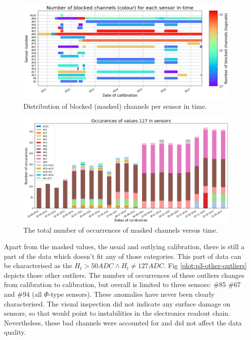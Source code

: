 \begin{figure}
    \centering
    \includegraphics[width=0.95\linewidth]{figures/chapter4/calib_analysis/P3-mask-time.png}
    \caption{Distribution of blocked (masked) channels per sensor in time.}
    \label{plot:p3-mask-time}
\end{figure}

\begin{figure}
    \centering
    \includegraphics[width=0.95\linewidth]{figures/chapter4/calib_analysis/P3-mask-time2.png}
    \caption{The total number of occurrences of masked channels versus time.}
    \label{plot:p3-mask-time2}
\end{figure}

Apart from the masked values, the usual and outlying calibration, there is still a part of the data which doesn't fit any of those categories.
This part of data can be characterised as the $H_{t} > 50 ADC \land H_{t} \neq 127 ADC$.
Fig \ref{plot:p3-other-outliers} depicts those other outliers. The number of occurrences of these outliers changes from calibration to calibration, but overall is limited to three sensors: \#85 \#67 and \#94 (all $\Phi$-type sensors). These anomalies have never been clearly characterised. The visual inspection did not indicate any surface damage on sensors, so that would point to instabilities in the electronics readout chain. Nevertheless, these bad channels were accounted for and did not affect the data quality.


